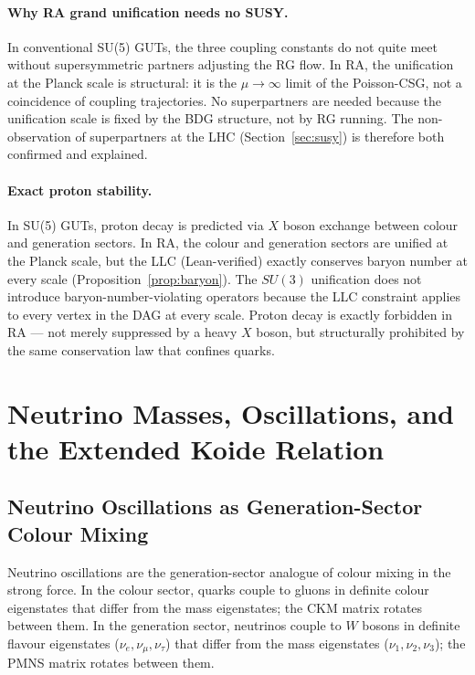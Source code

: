 \documentclass[11pt,a4paper]{article}
\begin{document}
\paragraph{Why RA grand unification needs no SUSY.}
In conventional SU(5) GUTs, the three coupling constants do not quite
meet without supersymmetric partners adjusting the RG flow. In RA, the
unification at the Planck scale is structural: it is the $\mu \to \infty$
limit of the Poisson-CSG, not a coincidence of coupling trajectories.
No superpartners are needed because the unification scale is fixed by
the BDG structure, not by RG running. The non-observation of superpartners
at the LHC (Section~\ref{sec:susy}) is therefore both confirmed and explained.

\paragraph{Exact proton stability.}
In SU(5) GUTs, proton decay is predicted via $X$ boson exchange between
colour and generation sectors. In RA, the colour and generation sectors
are unified at the Planck scale, but the LLC (Lean-verified) exactly conserves
baryon number at every scale (Proposition~\ref{prop:baryon}). The $SU(3)$
unification does not introduce baryon-number-violating operators because
the LLC constraint applies to every vertex in the DAG at every scale.
Proton decay is exactly forbidden in RA --- not merely suppressed by a heavy
$X$ boson, but structurally prohibited by the same conservation law that
confines quarks.

\section{Neutrino Masses, Oscillations, and the Extended Koide Relation}
\label{sec:neutrinos}

\subsection{Neutrino Oscillations as Generation-Sector Colour Mixing}

Neutrino oscillations are the generation-sector analogue of colour mixing
in the strong force. In the colour sector, quarks couple to gluons in
definite colour eigenstates that differ from the mass eigenstates; the
CKM matrix rotates between them. In the generation sector, neutrinos couple
to $W$ bosons in definite flavour eigenstates ($\nu_e, \nu_\mu, \nu_\tau$)
that differ from the mass eigenstates ($\nu_1, \nu_2, \nu_3$); the PMNS
matrix rotates between them.
\end{document}
